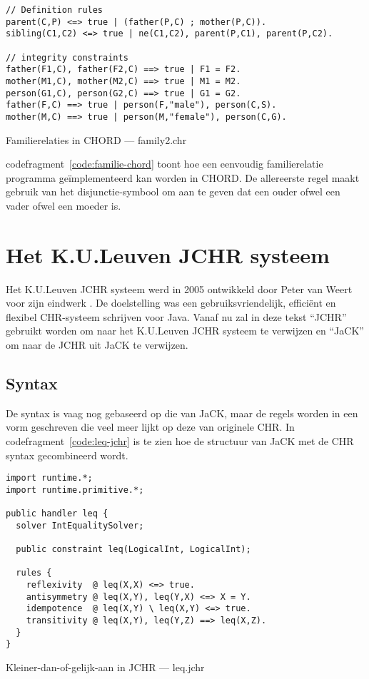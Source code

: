 \begin{exCode}[bhp]
\begin{Verbatim}[frame=single]
// Definition rules
parent(C,P) <=> true | (father(P,C) ; mother(P,C)).
sibling(C1,C2) <=> true | ne(C1,C2), parent(P,C1), parent(P,C2).

// integrity constraints
father(F1,C), father(F2,C) ==> true | F1 = F2.
mother(M1,C), mother(M2,C) ==> true | M1 = M2.
person(G1,C), person(G2,C) ==> true | G1 = G2.
father(F,C) ==> true | person(F,"male"), person(C,S).
mother(M,C) ==> true | person(M,"female"), person(C,G).
\end{Verbatim}
\caption{Familierelaties in CHORD --- family2.chr}
\label{code:familie-chord}
\end{exCode}
codefragment~\ref{code:familie-chord} toont hoe een eenvoudig familierelatie programma ge\"implementeerd kan worden in CHORD. De allereerste regel maakt gebruik van het disjunctie-symbool \code{;} om aan te geven dat een ouder ofwel een vader ofwel een moeder is.

\section{Het K.U.Leuven JCHR systeem}

Het K.U.Leuven JCHR systeem werd in 2005 ontwikkeld door Peter van Weert voor zijn eindwerk \cite{jchr_thesis}. De doelstelling was een gebruiksvriendelijk, effici\"ent en flexibel CHR-systeem schrijven voor Java. Vanaf nu zal in deze tekst ``JCHR'' gebruikt worden om naar het K.U.Leuven JCHR systeem te verwijzen en ``JaCK'' om naar de JCHR uit JaCK te verwijzen.

\subsection{Syntax}

De syntax is vaag nog gebaseerd op die van JaCK, maar de regels worden in een vorm geschreven die veel meer lijkt op deze van originele CHR. In codefragment~\ref{code:leq-jchr} is te zien hoe de structuur van JaCK met de CHR syntax gecombineerd wordt.
\begin{exCode}
\begin{Verbatim}[frame=single]
import runtime.*;
import runtime.primitive.*;

public handler leq {
  solver IntEqualitySolver;

  public constraint leq(LogicalInt, LogicalInt);

  rules {
    reflexivity  @ leq(X,X) <=> true.
    antisymmetry @ leq(X,Y), leq(Y,X) <=> X = Y.
    idempotence  @ leq(X,Y) \ leq(X,Y) <=> true.
    transitivity @ leq(X,Y), leq(Y,Z) ==> leq(X,Z).
  }
}

\end{Verbatim}
\caption{Kleiner-dan-of-gelijk-aan in JCHR --- leq.jchr}
\label{code:leq-jchr}
\end{exCode}

